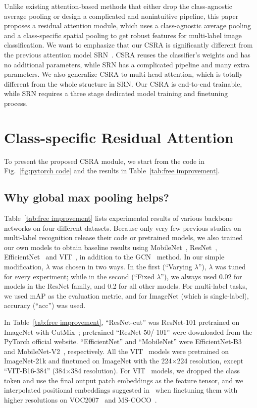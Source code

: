 \documentclass[10pt,twocolumn,letterpaper]{article}
\begin{document}
Unlike existing attention-based methods that either drop the class-agnostic average pooling or design a complicated and nonintuitive pipeline, this paper proposes a residual attention module, which uses a class-agnostic average pooling and a class-specific spatial pooling to get robust features for multi-label image classification. We want to emphasize that our CSRA is significantly different from the previous attention model SRN~\cite{2017_CVPR_SRN}. CSRA reuses the classifier's weights and has no additional parameters, while SRN has a complicated pipeline and many extra parameters. We also generalize CSRA to multi-head attention, which is totally different from the whole structure in SRN. Our CSRA is end-to-end trainable, while SRN requires a three stage dedicated model training and finetuning process.

\section{Class-specific Residual Attention}

To present the proposed CSRA module, we start from the code in Fig.~\ref{fig:pytorch code} and the results in Table~\ref{tab:free improvement}.

\subsection{Why global max pooling helps?}

Table~\ref{tab:free improvement} lists experimental results of various backbone networks on four different datasets. Because only very few previous studies on multi-label recognition release their code or pretrained models, we also trained our own models to obtain baseline results using MobileNet~\cite{MobileNet}, ResNet~\cite{ResNet}, EfficientNet~\cite{Efficientnet} and VIT~\cite{VIT}, in addition to the GCN~\cite{2019_CVPR_GCN} method. In our simple modification, $\lambda$ was chosen in two ways. In the first (``Varying $\lambda$''), $\lambda$ was tuned for every experiment; while in the second (``Fixed $\lambda$''), we always used 0.02 for models in the ResNet family, and 0.2 for all other models. For multi-label tasks, we used mAP as the evaluation metric, and for ImageNet (which is single-label), accuracy (``acc'') was used.

In Table~\ref{tab:free improvement}, ``ResNet-cut'' was ResNet-101 pretrained on ImageNet with CutMix~\cite{cutmix}; pretrained ``ResNet-50/-101'' were downloaded from the PyTorch official website. ``EfficientNet'' and ``MobileNet'' were EfficientNet-B3~\cite{Efficientnet} and MobileNet-V2~\cite{MobileNet}, respectively. All the VIT~\cite{VIT} models were pretrained on ImageNet-21k and finetuned on ImageNet with the 224$\times$224 resolution, except ``VIT-B16-384'' (384$\times$384 resolution). For VIT~\cite{VIT} models, we dropped the class token and use the final output patch embeddings as the feature tensor, and we interpolated positional embeddings suggested in~\cite{VIT} when finetuning them with higher resolutions on VOC2007~\cite{VOC} and MS-COCO~\cite{MSCOCO}.
\end{document}
